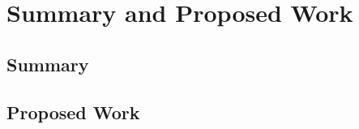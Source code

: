 \chapter[Summary and Proposed Work]{Summary and Proposed Work}

\section{Summary}

\section{Proposed Work}
